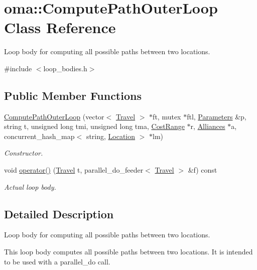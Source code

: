 \hypertarget{classoma_1_1_compute_path_outer_loop}{\section{oma\-:\-:Compute\-Path\-Outer\-Loop Class Reference}
\label{classoma_1_1_compute_path_outer_loop}
}


Loop body for computing all possible paths between two locations.  




{\ttfamily \#include $<$loop\-\_\-bodies.\-h$>$}

\subsection*{Public Member Functions}
\begin{DoxyCompactItemize}
\item 
\hyperlink{classoma_1_1_compute_path_outer_loop_afb133a3010cfc76f164ee067f1811c9b}{Compute\-Path\-Outer\-Loop} (vector$<$ \hyperlink{class_travel}{Travel} $>$ $\ast$ft, mutex $\ast$ftl, \hyperlink{struct_parameters}{Parameters} \&p, string t, unsigned long tmi, unsigned long tma, \hyperlink{class_cost_range}{Cost\-Range} $\ast$r, \hyperlink{types_8h_a942cbcc40778424afe78605ae5c364c0}{Alliances} $\ast$a, concurrent\-\_\-hash\-\_\-map$<$ string, \hyperlink{class_location}{Location} $>$ $\ast$lm)
\begin{DoxyCompactList}\small\item\em Constructor. \end{DoxyCompactList}\item 
void \hyperlink{classoma_1_1_compute_path_outer_loop_a2164d6ded1a950a24d5b8a264ecc2ccf}{operator()} (\hyperlink{class_travel}{Travel} t, parallel\-\_\-do\-\_\-feeder$<$ \hyperlink{class_travel}{Travel} $>$ \&f) const 
\begin{DoxyCompactList}\small\item\em Actual loop body. \end{DoxyCompactList}\end{DoxyCompactItemize}


\subsection{Detailed Description}
Loop body for computing all possible paths between two locations. 

This loop body computes all possible paths between two locations. It is intended to be used with a parallel\-\_\-do call.


